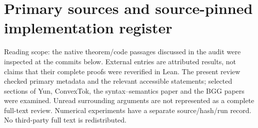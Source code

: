 \chapter{Primary sources and source-pinned implementation register}
\label{ch:wb-sources}
\noindent Reading scope: the native theorem/code passages discussed in the audit were inspected at the commits below. External entries are attributed results, not claims that their complete proofs were reverified in Lean. The present review checked primary metadata and the relevant accessible statements; selected sections of Yun, ConvexTok, the syntax--semantics paper and the BGG papers were examined. Unread surrounding arguments are not represented as a complete full-text review. Numerical experiments have a separate source/hash/run record. No third-party full text is redistributed.

